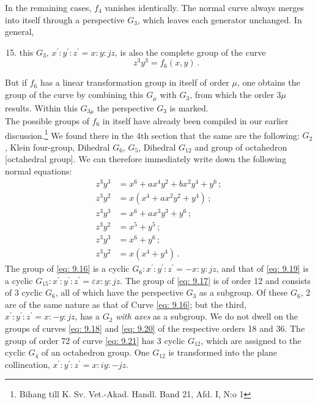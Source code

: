 \documentclass[leqno]{article}
\begin{document}
In the remaining cases, $f_4$ vanishes identically. The normal curve always merges into itself through a perspective $G_3$, which leaves each generator unchanged. In general, 
\begin{enumerate}[label=\arabic*)]
    \setcounter{enumi}{14}
    \item this $G_3$, $x^\prime: y^\prime : z^\prime = x:y:jz$, is also the complete group of the curve 
    \begin{equation}\label{eq: 9.15}
    z^3 y^3 = f_6(x, y) \, . \tag{15}
    \end{equation}
\end{enumerate}
But if $f_6$ has a linear transformation group in itself of order $\mu$, one obtains the group of the curve by combining this $G_\mu$ with $G_3$, from which the order $3\mu$ results. Within this $G_{3 \mu}$ the perspective $G_3$ is marked. \\
The possible groups of $f_6$ in itself have already been compiled in our earlier discussion.\footnote{Bihang till K. Sv. Vet.-Akad. Handl. Band 21, Afd. I, N:o 1} We found there in the 4th section that the same are the following: $G_2$, Klein four-group, Dihedral $G_6$, $G_5$, Dihedral $G_{12}$ and group of octahedron [octahedral group]. We can therefore immediately write down the following normal equations:
\begin{align}
	z^3 y^3 &= x^6 + ax^4 y^2 + bx^2 y^4 + y^6 \, ; \label{eq: 9.16} \tag{16} \\
	z^3 y^2 &= x(x^4 + ax^2 y^2 + y^4) \, ; \label{eq: 9.17} \tag{17} \\ 
	z^3 y^3 &= x^6 + a x^3 y^3 + y^6 \, ; \label{eq: 9.18} \tag{18} \\
	z^3 y^2 &= x^5 + y^5 \, ; \label{eq: 9.19} \tag{19} \\ 
	z^3 y^3 &= x^6 + y^6 \, ; \label{eq: 9.20} \tag{20} \\ 
	z^3 y^2 &= x(x^4 + y^4) \, . \label{eq: 9.21} \tag{21} 
\end{align}
The group of \eqref{eq: 9.16} is a cyclic $G_6 : x^\prime: y^\prime : z^\prime = - x : y: jz$, and that of \eqref{eq: 9.19} is a cyclic $G_{15} : x ^\prime : y^\prime : z^\prime = \varepsilon x : y : jz$. The group of \eqref{eq: 9.17} is of order 12 and consists of 3 cyclic $G_6$, all of which have the perspective $G_3$ as a subgroup. Of these $G_6$, 2 are of the same nature as that of Curve \eqref{eq: 9.16}; but the third, $x^\prime : y^\prime : z^\prime = x : -y : jz$, has a $G_2$ \textit{with axes} as a subgroup. We do not dwell on the groups of curves \eqref{eq: 9.18} and \eqref{eq: 9.20} of the respective orders 18 and 36. The group of order 72 of curve \eqref{eq: 9.21} has 3 cyclic $G_{12}$, which are assigned to the cyclic $G_4$ of an octahedron group. One $G_{12}$ is transformed into the plane collineation, $x^\prime : y^\prime : z^\prime = x : iy : -jz$. \\
\end{document}
